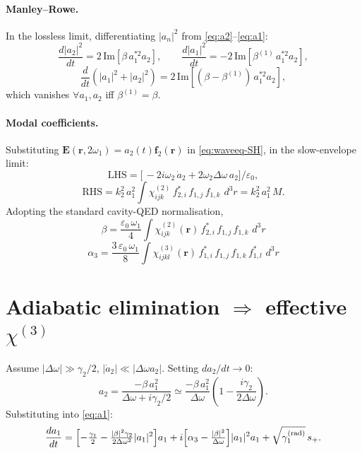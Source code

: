 \documentclass[11pt,a4paper]{article}
\newcommand{\eps}{\varepsilon}
\newcommand{\bvec}[1]{\mathbf{#1}}
\newcommand{\f}{\bvec{f}}
\newcommand{\ri}{\bvec{r}}
\newcommand{\dthreer}{\,d^{3}r}
\newcommand{\chitwo}{\chi^{(2)}}
\newcommand{\chithree}{\chi^{(3)}}
\newcommand{\Dom}{\Delta\omega}
\begin{document}
\paragraph{Manley--Rowe.} In the lossless limit, differentiating $|a_n|^2$ from \eqref{eq:a2}--\eqref{eq:a1}:
\begin{equation}
  \frac{d|a_2|^{2}}{dt}=2\,\mathrm{Im}[\beta\,a_1^{*2}a_2],\qquad
  \frac{d|a_1|^{2}}{dt}=-2\,\mathrm{Im}[\beta^{(1)}\,a_1^{*2}a_2],
\end{equation}
\begin{equation}
  \frac{d}{dt}(|a_1|^{2}+|a_2|^{2})=2\,\mathrm{Im}[(\beta-\beta^{(1)})\,a_1^{*2}a_2],
\end{equation}
which vanishes $\forall a_1,a_2$ iff $\beta^{(1)}=\beta$.

\paragraph{Modal coefficients.} Substituting $\mathbf E(\ri,2\omega_1)=a_2(t)\f_2(\ri)$ in \eqref{eq:waveeq-SH}, in the slow-envelope limit:
\begin{equation*}
  \mathrm{LHS}=\bigl[\,-2i\omega_2\,\dot a_2 + 2\omega_2\Dom\,a_2\bigr]/\eps_0,
\end{equation*}
\begin{equation*}
  \mathrm{RHS}=k_2^{2}\,a_1^{2}\!\int\!\chitwo_{ijk}\,f_{2,i}^{*}\,f_{1,j}\,f_{1,k}\,\dthreer=k_2^{2}\,a_1^{2}\,M.
\end{equation*}
Adopting the standard cavity-QED normalisation,
\begin{equation}
  \boxed{\;\beta=\frac{\eps_0\,\omega_1}{4}\!\int\!\chitwo_{ijk}(\ri)\,
                f_{2,i}^*\,f_{1,j}\,f_{1,k}\,\dthreer\;}
\label{eq:beta}
\end{equation}
\begin{equation}
  \boxed{\;\alpha_3=\frac{3\,\eps_0\,\omega_1}{8}\!\int\!\chithree_{ijkl}(\ri)\,
                  f_{1,i}^*\,f_{1,j}\,f_{1,k}\,f_{1,l}^*\,\dthreer\;}
\label{eq:alpha3}
\end{equation}

\section{Adiabatic elimination $\Rightarrow$ effective $\chithree$}\label{sec:adiab}

Assume $|\Dom|\gg\gamma_2/2$, $|\dot a_2|\ll|\Dom a_2|$. Setting $da_2/dt\to 0$:
\begin{equation}
  a_2=\frac{-\beta\,a_1^2}{\Dom+i\gamma_2/2}
     \simeq\frac{-\beta\,a_1^2}{\Dom}\!\left(1-\frac{i\gamma_2}{2\Dom}\right).
\end{equation}
Substituting into \eqref{eq:a1}:
\begin{equation}
  \frac{da_1}{dt}=
   \Bigl[-\tfrac{\gamma_1}{2}-\tfrac{|\beta|^2\gamma_2}{2\Dom^{2}}|a_1|^2\Bigr]a_1
   +i\Bigl[\alpha_3-\tfrac{|\beta|^2}{\Dom}\Bigr]|a_1|^2 a_1
   +\sqrt{\gamma_1^{(\text{rad})}}\,s_+ .
\end{equation}
\end{document}
